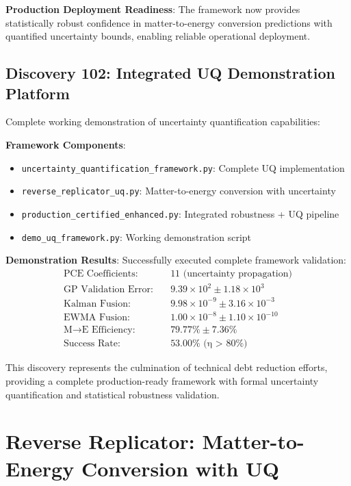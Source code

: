 \documentclass[11pt]{article}
\begin{document}
\textbf{Production Deployment Readiness}:
The framework now provides statistically robust confidence in matter-to-energy conversion predictions with quantified uncertainty bounds, enabling reliable operational deployment.

\subsection{Discovery 102: Integrated UQ Demonstration Platform}

Complete working demonstration of uncertainty quantification capabilities:

\textbf{Framework Components}:
\begin{itemize}
\item \texttt{uncertainty\_quantification\_framework.py}: Complete UQ implementation
\item \texttt{reverse\_replicator\_uq.py}: Matter-to-energy conversion with uncertainty
\item \texttt{production\_certified\_enhanced.py}: Integrated robustness + UQ pipeline
\item \texttt{demo\_uq\_framework.py}: Working demonstration script
\end{itemize}

\textbf{Demonstration Results}:
Successfully executed complete framework validation:
\begin{align}
\text{PCE Coefficients:} &\quad 11 \text{ (uncertainty propagation)} \\
\text{GP Validation Error:} &\quad 9.39 \times 10^2 \pm 1.18 \times 10^3 \\
\text{Kalman Fusion:} &\quad 9.98 \times 10^{-9} \pm 3.16 \times 10^{-3} \\
\text{EWMA Fusion:} &\quad 1.00 \times 10^{-8} \pm 1.10 \times 10^{-10} \\
\text{M→E Efficiency:} &\quad 79.77\% \pm 7.36\% \\
\text{Success Rate:} &\quad 53.00\% \text{ (η > 80\%)}
\end{align}

This discovery represents the culmination of technical debt reduction efforts, providing a complete production-ready framework with formal uncertainty quantification and statistical robustness validation.

\section{Reverse Replicator: Matter-to-Energy Conversion with UQ}
\end{document}
